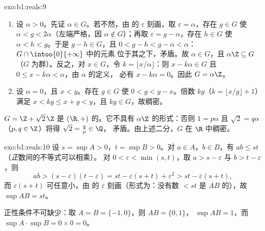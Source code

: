 \begin{solution}{exo:b1:reals:9}
\begin{enumerate}
  \item 设 $\alpha > 0$。先证 $\alpha \in G$。若不然，由
        的 $\varepsilon$ 刻画，取
        $\varepsilon = \alpha$，存在 $g \in G$ 使 $\alpha < g <
        2\alpha$（左端严格，因 $\alpha \notin G$）；再取
        $\varepsilon = g - \alpha$，存在 $h \in G$ 使
        $\alpha < h < g$。于是 $g - h \in G$，且 $0 < g - h < g -
        \alpha < \alpha$：$G \cap \intoo{0}{+\infty}$ 中的元素
        位于其之下，矛盾。故 $\alpha \in G$，且 $\alpha\Z
        \subseteq G$（$G$ 为群）。反之，对 $x \in G$，令
        $k = \lfloor x/\alpha \rfloor$：则 $x - k\alpha \in G$ 且
        $0 \leq x - k\alpha < \alpha$，由 $\alpha$ 的定义，
        必有 $x - k\alpha = 0$。因此 $G = \alpha\Z$。
  \item 设 $\alpha = 0$，且 $x < y$。存在 $g \in G$
        使 $0 < g < y - x$。倍数 $kg$（$k = \lfloor x/g
        \rfloor + 1$）满足 $x < kg \leq x + g < y$，且 $kg \in
        G$，故稠密。
\end{enumerate}
$G = \Z + \sqrt 2\,\Z$ 是 $(\R, +)$ 的。它不具有
$\alpha\Z$ 的形式：否则 $1 = p\alpha$ 且 $\sqrt 2 = q\alpha$
（$p, q \in \Z$）将得 $\sqrt 2 = \frac qp \in \Q$，
矛盾。由上述二分，$G$ 在 $\R$ 中稠密。
\end{solution}

\begin{solution}{exo:b1:reals:10}
设 $s = \sup A > 0$，$t = \sup B > 0$。对 $a \in A$，$b \in B$，有 $ab
\leq st$（\emph{正}数间的不等式可以相乘）。
对 $0 < \varepsilon < \min(s, t)$，取 $a > s - \varepsilon$ 与
$b > t - \varepsilon$，则
\[
ab > (s - \varepsilon)(t - \varepsilon)
= st - \varepsilon(s + t) + \varepsilon^2
> st - \varepsilon (s + t),
\]
而 $\varepsilon(s+t)$ 可任意小，由
的 $\varepsilon$ 刻画（形式为：没有数 $< st$ 是
$AB$ 的），故 $\sup AB = st$。

正性条件不可缺少：取 $A = B = \{-1, 0\}$，则 $AB = \{0, 1\}$，
$\sup AB = 1$，而 $\sup A \cdot \sup B = 0 \times 0 = 0$。
\end{solution}

